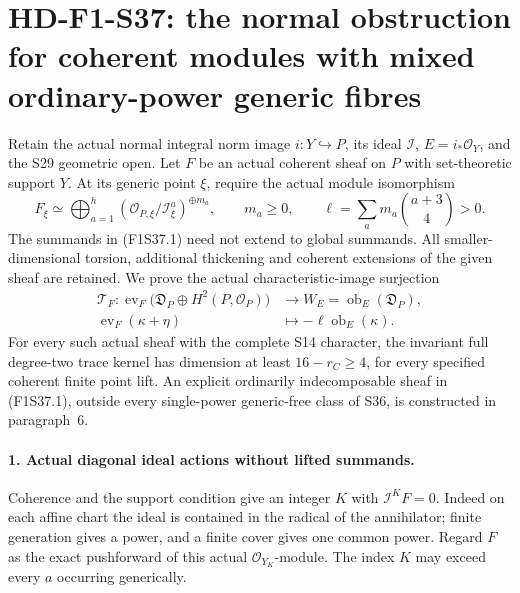 \section[HD-F1-S37: mixed ordinary-power modules]{HD-F1-S37: the normal obstruction for coherent modules with mixed ordinary-power generic fibres}
\label{sec:f1-norm-fourfold-mixed-power-modules}

Retain the actual normal integral norm image
$i:Y\hookrightarrow P$, its ideal $\mathcal I$,
$E=i_*\mathcal O_Y$, and the S29 geometric open.
Let $F$ be an actual coherent sheaf on $P$ with
set-theoretic support $Y$. At its generic point
$\xi$, require the actual module isomorphism
\[
 F_\xi\simeq\bigoplus_{a=1}^h
       (\mathcal O_{P,\xi}/\mathcal I_\xi^a)^{\oplus m_a},
 \qquad m_a\ge0,\qquad
 \ell=\sum_a m_a\binom{a+3}{4}>0.
 \tag{F1S37.1}
\]
The summands in (F1S37.1) need not extend to
global summands. All smaller-dimensional torsion,
additional thickening and coherent extensions
of the given sheaf are retained. We prove the
actual characteristic-image surjection
\[
\begin{split}
 \mathcal T_F:\operatorname{ev}_F
   \bigl(\mathfrak D_P\oplus H^2(P,\mathcal O_P)\bigr)
     &\longrightarrow W_E=\operatorname{ob}_E(\mathfrak D_P),\\
 \operatorname{ev}_F(\kappa+\eta)
     &\longmapsto-\ell\operatorname{ob}_E(\kappa).
\end{split}
 \tag{F1S37.2}
\]
For every such actual sheaf with the complete
S14 character, the invariant full degree-two
trace kernel has dimension at least
$16-r_C\ge4$, for every specified coherent
finite point lift. An explicit ordinarily
indecomposable sheaf in (F1S37.1), outside
every single-power generic-free class of S36,
is constructed in paragraph~6.

\paragraph{1. Actual diagonal ideal actions without lifted summands.}
Coherence and the support condition give an
integer $K$ with $\mathcal I^K F=0$.
Indeed on each affine chart the ideal is
contained in the radical of the annihilator;
finite generation gives a power, and a finite
cover gives one common power. Regard $F$
as the exact pushforward of this actual
$\mathcal O_{Y_K}$-module. The index $K$
may exceed every $a$ occurring generically.

